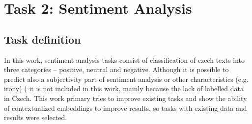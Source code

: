 \chapter{Task 2: Sentiment Analysis}
\label{chap:sent}


\section{Task definition}
In this work, sentiment analysis tasks consist of classification of czech texts into three categories -- positive, neutral and negative. Although it is possible to predict also a subjectivity part of sentiment analysis or other characteristics (e.g. irony) ( %
it is not included in this work, mainly because the lack of labelled data in Czech. This work primary tries to improve existing tasks and show the ability of contextualized embeddings to improve results, so tasks with existing data and results were selected. %